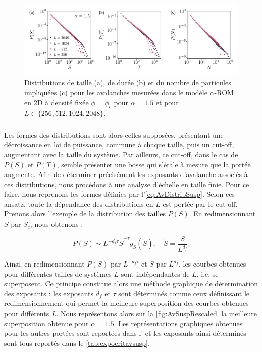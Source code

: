 \begin{figure}[h]
	\centering
	\includegraphics[width=\textwidth]{Chapitre3/Figures/Avalanches/Av_alpha15_edited.pdf}
	\caption{Distributions de taille (a), de durée (b) et du nombre de particules impliquées (c) pour les avalanches mesurées dans le modèle $\alpha$-ROM en 2D à densité fixée $\phi=\phi_c$ pour $\alpha = 1.5$ et pour $L \in \{ 256, 512, 1024, 2048 \}$.}
	\label{fig:AvSuspNotRescaled}
\end{figure}

\subparagraph{}Les formes des distributions sont alors celles supposées, présentant une décroissance en loi de puissance, commune à chaque taille, puis un cut-off, augmentant avec la taille du système. Par ailleurs, ce cut-off, dans le cas de $P(S)$ et $P(T)$, semble présenter une bosse qui s'étale à mesure que la portée augmente. Afin de déterminer précisément les exposants d'avalanche associés à ces distributions, nous procédons à une analyse d'échelle en taille finie. Pour ce faire, nous reprenons les formes définies par l'\autoref{eq:AvDistribSusp}. Selon ces ansatz, toute la dépendance des distributions en $L$ est portée par le cut-off. Prenons alors l'exemple de la distribution des tailles $P(S)$. En redimensionnant $S$ par $S_c$, nous obtenons :

\begin{equation}
	P(S) \sim L^{-d_f\tau}\tilde{S}^{-\tau}g_S\left( \tilde{S} \right),  \quad \tilde{S} = \frac{S}{L^{d_f}}.
\end{equation}

\noindent Ainsi, en redimensionnant $P(S)$ par $L^{-d_f\tau}$ et $S$ par $L^{d_f}$, les courbes obtenues pour différentes tailles de systèmes $L$ sont indépendantes de $L$, i.e. se superposent. Ce principe constitue alors une méthode graphique de détermination des exposants : les exposants $d_f$ et $\tau$ sont déterminés comme ceux définissant le redimensionnement qui permet la meilleure superposition des courbes obtenues pour différents $L$. Nous représentons alors sur la \autoref{fig:AvSuspRescaled} la meilleure superposition obtenue pour $\alpha = 1.5$. Les représentations graphiques obtenues pour les autres portées sont reportées dans l' et les exposants ainsi déterminés sont tous reportés dans le \autoref{tab:expocritavsusp}.

